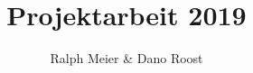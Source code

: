 




\title{Projektarbeit 2019}
\author{Ralph Meier & Dano Roost}


\NewPage
%
\NewPage
\setcounter{page}{1}




% 

\tableofcontents
\newpage









 






